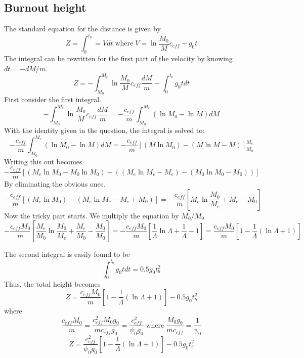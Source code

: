 \subsection*{Burnout height}
The standard equation for the distance is given by
\begin{equation}
Z = \int_{0}^{t_b}=Vdt \;\text{where}\; V=\ln\frac{M_0}{M} c_{eff}-g_0t
\end{equation}
The integral can be rewritten for the first part of the velocity by knowing $dt = -dM/m$.
\begin{equation}
Z = -\int_{M_0}^{M_e}\ln\frac{M_0}{M} c_{eff}\frac{dM}{m}-\int_{0}^{t_b}g_0tdt
\end{equation}
First consider the first integral.
\begin{equation}
-\int_{M_0}^{M_e}\ln\frac{M_0}{M} c_{eff}\frac{dM}{m}=-\frac{c_{eff}}{m}\int_{M_0}^{M_e}(\ln M_0-\ln M) dM
\end{equation}
With the identity given in the question, the integral is solved to:
\begin{equation}
-\frac{c_{eff}}{m}\int_{M_0}^{M_e}(\ln M_0-\ln M) dM=-\frac{c_{eff}}{m}[(M\ln M_0)-(M\ln M-M)]_{M_0}^{M_e}
\end{equation}
Writing this out becomes
\begin{equation}
-\frac{c_{eff}}{m}[(M_e\ln M_0-M_0\ln M_0)-((M_e\ln M_e-M_e)-(M_0\ln M_0-M_0))]
\end{equation}
By eliminating the obvious ones.
\begin{equation}
-\frac{c_{eff}}{m}[(M_e\ln M_0)-(M_e\ln M_e-M_e+M_0)]=-\frac{c_{eff}}{m}[M_e\ln\frac{M_0}{M_e}+M_e-M_0]
\end{equation}
Now the tricky part starts. We multiply the equation by $M_0/M_0$
\begin{equation}
-\frac{c_{eff}M_0}{m}[\frac{M_e}{M_0}\ln\frac{M_0}{M_e}+\frac{M_e}{M_0}-\frac{M_0}{M_0}]=-\frac{c_{eff}M_0}{m}[\frac{1}{\Lambda}\ln\Lambda+\frac{1}{\Lambda}-1]=\frac{c_{eff}M_0}{m}[1-\frac{1}{\Lambda}(\ln\Lambda+1)]
\end{equation}

The second integral is easily found to be 
\begin{equation}
\int_{0}^{t_b}g_0tdt = 0.5g_0t_b^2
\end{equation}
Thus, the total height becomes
\begin{equation}
Z = \frac{c_{eff}M_0}{m}[1-\frac{1}{\Lambda}(\ln\Lambda+1)]-0.5g_0t_b^2
\end{equation}
where 
\begin{equation}
\frac{c_{eff}M_0}{m}=\frac{c_{eff}^2M_0g_0}{mc_{eff}g_0}=\frac{c_{eff}^2}{\psi_0g_0} \;\text{where}\;\frac{M_0g_0}{mc_{eff}}=\frac{1}{\psi_0}
\end{equation}
\begin{equation}
Z = \frac{c_{eff}^2}{\psi_0g_0}[1-\frac{1}{\Lambda}(\ln\Lambda+1)]-0.5g_0t_b^2
\end{equation}

